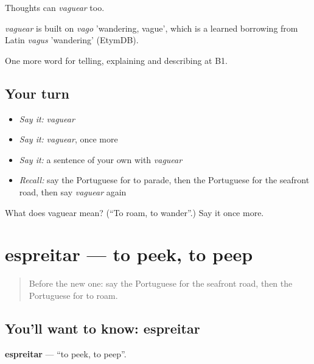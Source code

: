 Thoughts can \emph{vaguear} too.

\begin{cousinweb}
\emph{vaguear} is built on \emph{vago} 'wandering, vague', which is a learned borrowing from Latin \emph{vagus} 'wandering' (EtymDB).
\end{cousinweb}

\begin{grammarlens}[title={What you've built}]
One more word for telling, explaining and describing at B1.
\end{grammarlens}

\subsection*{Your turn}
\begin{itemize}
\raggedright
  \item \emph{Say it:} \emph{vaguear}
  \item \emph{Say it:} \emph{vaguear}, once more
  \item \emph{Say it:} a sentence of your own with \emph{vaguear}
  \item \emph{Recall:} say the Portuguese for to parade, then the Portuguese for the seafront road, then say \emph{vaguear} again
\end{itemize}

\begin{tcolorbox}[breakable,colback=teal!4,colframe=teal!35!black,title={Before you move on}]
What does vaguear mean? (\textquotedblleft{}To roam, to wander\textquotedblright{}.) Say it once more.
\end{tcolorbox}
\section[espreitar]{espreitar — to peek, to peep}

\label{lesson:PT-C447-espreitar}



\begin{quote}
Before the new one: say the Portuguese for the seafront road, then the Portuguese for to roam.
\end{quote}

\subsection*{You'll want to know: espreitar}
\textbf{espreitar} — \textquotedblleft{}to peek, to peep\textquotedblright{}.

